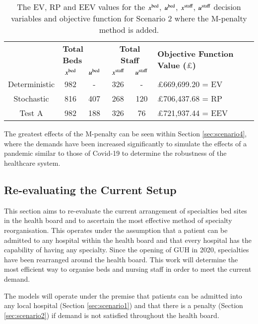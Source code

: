 \documentclass[../thesis.tex]{subfiles}
\begin{document}
\begin{table}[h!]
    \centering
    \begin{tabular}{cccccl}\toprule
 & \multicolumn{2}{l}{\textbf{Total Beds}} & \multicolumn{2}{c}{\textbf{Total Staff}} & \multirow{2}{*}{\textbf{Objective Function Value ($\pounds$)}}\\ \cmidrule(lr){2-3} \cmidrule(lr){4-5}
         
 & $x^\textnormal{bed}$           & $u^\textnormal{bed}$          & $x^\textnormal{staff}$         & $u^\textnormal{staff}$         \\ \midrule
 Deterministic & 982  & - & 326 & - &$\pounds$669,699.20 = EV \\
 Stochastic & 816 & 407 & 268 & 120  & $\pounds$706,437.68 = RP \\
 Test A & 982 & 188 & 326 & 76 & $\pounds$721,937.44 = EEV \\\bottomrule
    \end{tabular}
    \caption{The EV, RP and EEV values for the $x^\textnormal{bed}$, $u^\textnormal{bed}$, $x^\textnormal{staff}$, $u^\textnormal{staff}$ decision variables and objective function for Scenario 2 where the M-penalty method is added.}
    \label{tab:Scenario2Results}
\end{table}


The greatest effects of the M-penalty can be seen within Section \ref{sec:scenario4}, where the demands have been increased significantly to simulate the effects of a pandemic similar to those of Covid-19 to determine the robustness of the healthcare system.

\subsection{Re-evaluating the Current Setup}\label{sec:scenario3}
This section aims to re-evaluate the current arrangement of specialties bed sites in the health board and to ascertain the most effective method of specialty reorganisation. This operates under the assumption that a patient can be admitted to any hospital within the health board and that every hospital has the capability of having any specialty. Since the opening of GUH in 2020, specialties have been rearranged around the health board. This work will determine the most efficient way to organise beds and nursing staff in order to meet the current demand.

The models will operate under the premise that patients can be admitted into any local hospital (Section \ref{sec:scenario1}) and that there is a penalty (Section \ref{sec:scenario2}) if demand is not satisfied throughout the health board.
\end{document}
